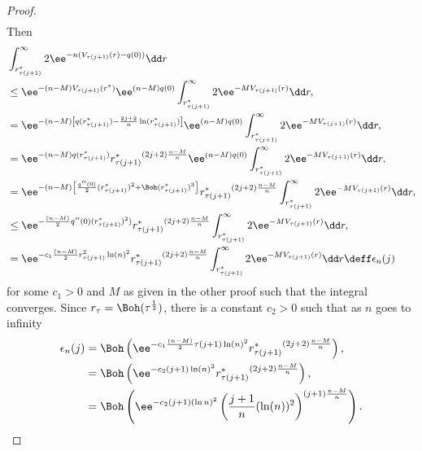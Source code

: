 \begin{proof}
\begin{align}
\end{align}
Then
\begin{align}
	&  \int_{r^*_{\tau(j+1)}}^{\infty} 2 \ee^{-n (V_{\tau(j+1)}(r) - q(0))} \dd r \\
	& \leq  \ee^{ - (n - M) V_{\tau(j+1)}(r^*)} \ee^{(n-M) q(0)}\int_{r^*_{\tau(j+1)}}^{\infty} 2 \ee^{-M V_{\tau(j+1)}(r) } \dd r, \\
	& =  \ee^{ - (n - M) \left[ q(r^*_{\tau(j+1)}) - \frac{2j+2}{n} \ln(r^*_{\tau(j+1)}) \right]} \ee^{(n-M) q(0)} \int_{r^*_{\tau(j+1)}}^{\infty} 2 \ee^{-M V_{\tau(j+1)}(r) } \dd r, \\
	& = \ee^{- (n-M) q(r^*_{\tau(j+1)})} {r^*_{\tau(j+1)}}^{(2j+2) \frac{n-M}{n}} \ee^{(n-M) q(0)} \int_{r^*_{\tau(j+1)}}^{\infty} 2 \ee^{-M V_{\tau(j+1)}(r) } \dd r, \\
	& = \ee^{- (n-M) \left[\frac{q''(0)}{2}  (r^*_{\tau(j+1)})^2 + \Boh(r^*_{\tau(j+1)})^3\right] } {r^*_{\tau(j+1)}}^{(2j+2) \frac{n-M}{n}} \int_{r^*_{\tau(j+1)}}^{\infty} 2 \ee^{-M V_{\tau(j+1)}(r)} \dd r, \\
	& \leq \ee^{- \frac{(n-M)}{2} q''(0) (r^*_{\tau(j+1)})^2)} {r^*_{\tau(j+1)}}^{(2j+2)\frac{n-M}{n}} \int_{r^*_{\tau(j+1)}}^{\infty} 2 \ee^{-M V_{\tau(j+1)}(r)} \dd r, \\
	& = \ee^{- c_1 \frac{(n-M)}{2}r_{\tau(j+1)}^2 \ln(n)^2} {r^*_{\tau(j+1)}}^{(2j+2)\frac{n-M}{n}} \int_{r^*_{\tau(j+1)}}^{\infty} 2 \ee^{-M V_{\tau(j+1)}(r)} \dd r \deff \epsilon_n(j) \\
\end{align}
for some $c_1 > 0$ and $M$ as given in the other proof such that the integral converges.  Since $r_\tau = \Boh(\tau^{\frac{1}{2}})$, there is a constant $c_2 > 0$ such that as $n$ goes to infinity
\begin{align}
	\epsilon_n(j)  & = \Boh \left(\ee^{- c_1 \frac{(n-M)}{2} \tau(j+1) \ln(n)^2} {r^*_{\tau(j+1)}}^{(2j+2)\frac{n-M}{n}}\right), \\
	&= \Boh \left(\ee^{- c_2 (j+1) \ln(n)^2} {r^*_{\tau(j+1)}}^{(2j+2)\frac{n-M}{n}}\right), \\
	& = \Boh\left(\ee^{-c_2 (j + 1) (\ln n)^2}  \left(\frac{j+1}{n} (\ln(n))^2 \right)^{(j+1) \frac{n-M}{n}} \right).
\end{align}


\end{proof}
